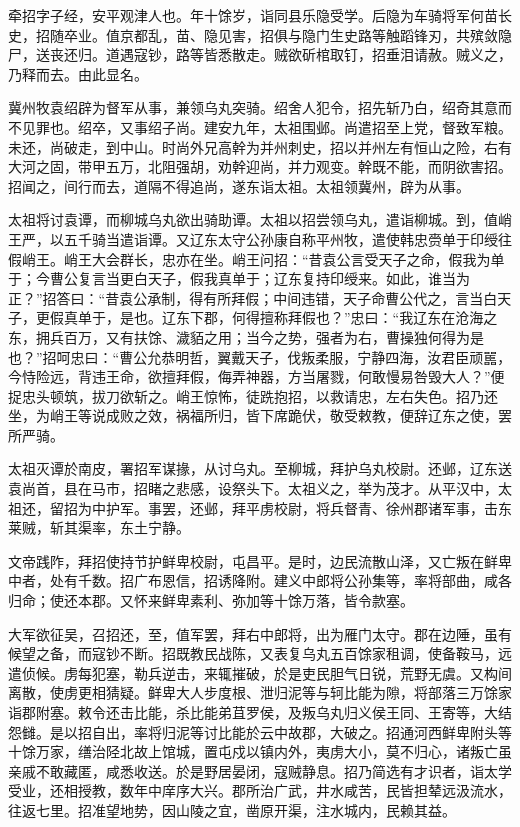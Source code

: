 \documentclass[12pt,UTF8]{ctexbook}
\begin{document}
牵招字子经，安平观津人也。年十馀岁，诣同县乐隐受学。后隐为车骑将军何苗长史，招随卒业。值京都乱，苗、隐见害，招俱与隐门生史路等触蹈锋刃，共殡敛隐尸，送丧还归。道遇寇钞，路等皆悉散走。贼欲斫棺取钉，招垂泪请赦。贼义之，乃释而去。由此显名。

冀州牧袁绍辟为督军从事，兼领乌丸突骑。绍舍人犯令，招先斩乃白，绍奇其意而不见罪也。绍卒，又事绍子尚。建安九年，太祖围邺。尚遣招至上党，督致军粮。未还，尚破走，到中山。时尚外兄高幹为并州刺史，招以并州左有恒山之险，右有大河之固，带甲五万，北阻强胡，劝幹迎尚，并力观变。幹既不能，而阴欲害招。招闻之，间行而去，道隔不得追尚，遂东诣太祖。太祖领冀州，辟为从事。

太祖将讨袁谭，而柳城乌丸欲出骑助谭。太祖以招尝领乌丸，遣诣柳城。到，值峭王严，以五千骑当遣诣谭。又辽东太守公孙康自称平州牧，遣使韩忠赍单于印绶往假峭王。峭王大会群长，忠亦在坐。峭王问招：“昔袁公言受天子之命，假我为单于；今曹公复言当更白天子，假我真单于；辽东复持印绶来。如此，谁当为正？”招答曰：“昔袁公承制，得有所拜假；中间违错，天子命曹公代之，言当白天子，更假真单于，是也。辽东下郡，何得擅称拜假也？”忠曰：“我辽东在沧海之东，拥兵百万，又有扶馀、濊貊之用；当今之势，强者为右，曹操独何得为是也？”招呵忠曰：“曹公允恭明哲，翼戴天子，伐叛柔服，宁静四海，汝君臣顽嚚，今恃险远，背违王命，欲擅拜假，侮弄神器，方当屠戮，何敢慢易咎毁大人？”便捉忠头顿筑，拔刀欲斩之。峭王惊怖，徒跣抱招，以救请忠，左右失色。招乃还坐，为峭王等说成败之效，祸福所归，皆下席跪伏，敬受敕教，便辞辽东之使，罢所严骑。

太祖灭谭於南皮，署招军谋掾，从讨乌丸。至柳城，拜护乌丸校尉。还邺，辽东送袁尚首，县在马市，招睹之悲感，设祭头下。太祖义之，举为茂才。从平汉中，太祖还，留招为中护军。事罢，还邺，拜平虏校尉，将兵督青、徐州郡诸军事，击东莱贼，斩其渠率，东土宁静。

文帝践阼，拜招使持节护鲜卑校尉，屯昌平。是时，边民流散山泽，又亡叛在鲜卑中者，处有千数。招广布恩信，招诱降附。建义中郎将公孙集等，率将部曲，咸各归命；使还本郡。又怀来鲜卑素利、弥加等十馀万落，皆令款塞。

大军欲征吴，召招还，至，值军罢，拜右中郎将，出为雁门太守。郡在边陲，虽有候望之备，而寇钞不断。招既教民战陈，又表复乌丸五百馀家租调，使备鞍马，远遣侦候。虏每犯塞，勒兵逆击，来辄摧破，於是吏民胆气日锐，荒野无虞。又构间离散，使虏更相猜疑。鲜卑大人步度根、泄归泥等与轲比能为隙，将部落三万馀家诣郡附塞。敕令还击比能，杀比能弟苴罗侯，及叛乌丸归义侯王同、王寄等，大结怨雠。是以招自出，率将归泥等讨比能於云中故郡，大破之。招通河西鲜卑附头等十馀万家，缮治陉北故上馆城，置屯戍以镇内外，夷虏大小，莫不归心，诸叛亡虽亲戚不敢藏匿，咸悉收送。於是野居晏闭，寇贼静息。招乃简选有才识者，诣太学受业，还相授教，数年中庠序大兴。郡所治广武，井水咸苦，民皆担辇远汲流水，往返七里。招准望地势，因山陵之宜，凿原开渠，注水城内，民赖其益。
\end{document}
